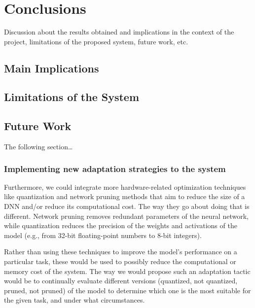 \documentclass[../main.tex]{subfiles}
\begin{document}
\chapter{Conclusions} \label{chap:conclusions} 
    

    Discussion about the results obtained and implications in the context of the project, limitations of the proposed system, future work, etc.
    

    \section{Main Implications} \label{conclusions:implications} 

    \section{Limitations of the System} \label{conclusions:limitations} 
    
    \section{Future Work} \label{conclusions:future_work} 

    The following section\dots

    \subsection{
        Implementing new adaptation strategies to the system 
    } \label{conclusions:future_work:adaptation_strategies}

    Furthermore, we could integrate more hardware-related optimization techniques like quantization and network pruning methods that aim to reduce the size of a DNN and/or reduce its computational cost. The way they go about doing that is different. Network pruning removes redundant parameters of the neural network, while quantization reduces the precision of the weights and activations of the model (e.g., from 32-bit floating-point numbers to 8-bit integers).
    
    Rather than using these techniques to improve the model's performance on a particular task, these would be used to possibly reduce the computational or memory cost of the system. The way we would propose such an adaptation tactic would be to continually evaluate different versions (quantized, not quantized, pruned, not pruned) of the model to determine which one is the most suitable for the given task, and under what circumstances.
\end{document}
